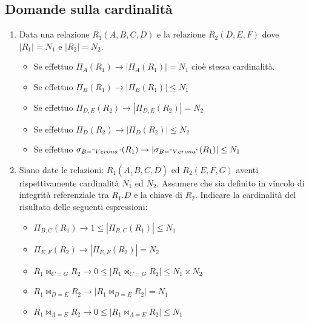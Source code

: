 \documentclass{article}
\begin{document}
\subsection{Domande sulla cardinalità}
\begin{enumerate}
	\item Data una relazione $R_1(\underline{A},B,C,D)$ e la relazione $R_2(\underline{D},\underline{E},F)$ dove $|R_1| = N_1$ e $|R_2| = N_2$. \begin{itemize}
		\item Se effettuo $\Pi_{A} (R_1) \to |\Pi_{A} (R_1)|=N_1$ cioè stessa cardinalità.
		\item Se effettuo $\Pi_{B} (R_1) \to |\Pi_{B} (R_1) | \leq N_1$
		\item Se effettuo $\Pi_{D,E} (R_2) \to | \Pi_{D,E} (R_2) | = N_2$
		\item Se effettuo $\Pi_{D} (R_2) \to | \Pi_{D} (R_2) | \leq N_2$
		\item Se effettuo $\sigma_{B = "Verona"} (R_1) \to |\sigma_{B = "Verona"} (R_1) | \leq N_1 $
	\end{itemize}
	
	\item Siano date le relazioni: $R_1(\underline{A,B}, C,D)$ ed $R_2(\underline{E},F,G)$ aventi rispettivamente cardinalità $N_1$ ed $N_2$. Assumere che sia definito in vincolo di integrità referenziale tra $R_1.D$ e la chiave di $R_2$. Indicare la cardinalità del risultato delle seguenti espressioni: \begin{itemize}
		\item $\Pi_{B,C}(R_1) \rightarrow 1 \leq |\Pi_{B,C}(R_1)| \leq N_1$ 
		\item $\Pi_{E,F}(R_2) \rightarrow | \Pi_{E,F}(R_2)| = N_2$
		\item $R_1 \bowtie_{C = G}R_2 \rightarrow 0 \leq |R_1 \bowtie_{C = G}R_2| \leq N_1 \times N_2 $
		\item $R_1 \bowtie_{D = E}R_2 \rightarrow | R_1 \bowtie_{D = E}R_2 | = N_1$
		\item $R_1 \bowtie_{A = E}R_2\rightarrow 0 \leq | R_1 \bowtie_{A = E}R_2| \leq N_1$
	\end{itemize}
	

\end{enumerate}
\end{document}
